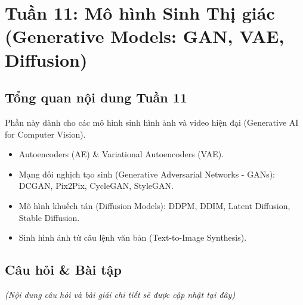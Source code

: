 \section{Tuần 11: Mô hình Sinh Thị giác (Generative Models: GAN, VAE, Diffusion)}
\label{sec:week11}

\subsection{Tổng quan nội dung Tuần 11}
Phần này dành cho các mô hình sinh hình ảnh và video hiện đại (Generative AI for Computer Vision).

\begin{itemize}
    \item Autoencoders (AE) \& Variational Autoencoders (VAE).
    \item Mạng đối nghịch tạo sinh (Generative Adversarial Networks - GANs): DCGAN, Pix2Pix, CycleGAN, StyleGAN.
    \item Mô hình khuếch tán (Diffusion Models): DDPM, DDIM, Latent Diffusion, Stable Diffusion.
    \item Sinh hình ảnh từ câu lệnh văn bản (Text-to-Image Synthesis).
\end{itemize}

\subsection{Câu hỏi \& Bài tập}
\textit{(Nội dung câu hỏi và bài giải chi tiết sẽ được cập nhật tại đây)}
